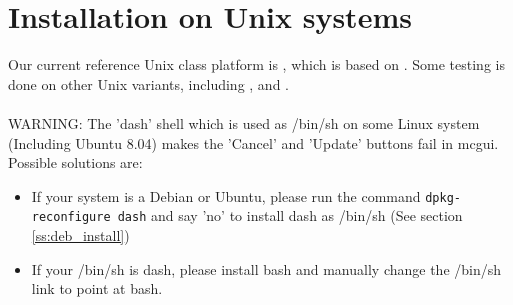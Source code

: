 \section{Installation on Unix systems}
\label{s:unix_install}
Our current reference Unix class platform is
, which is
based on . Some testing is done on other
Unix variants, including ,
and .
\ \\\ \\
 WARNING: The 'dash' shell which is used as /bin/sh on some Linux system (Including Ubuntu 8.04) makes the 'Cancel' and 'Update'
  buttons fail in mcgui. Possible solutions are:
\begin{itemize}
 \item If your system is a Debian or Ubuntu, please run the command
   \verb+dpkg-reconfigure dash+ and say 'no' to install dash as /bin/sh  (See section \ref{ss:deb_install})
 \item If your /bin/sh is dash, please install bash and manually change the /bin/sh link to point at bash.
\end{itemize}

